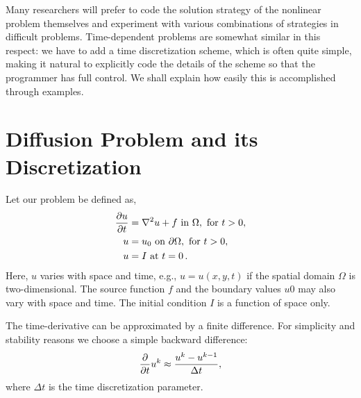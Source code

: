 Many researchers will prefer to code the solution strategy of the nonlinear problem themselves and experiment with various combinations of strategies in difficult problems. Time-dependent problems are somewhat similar in this respect: we have to add a time discretization scheme, which is often quite simple, making it natural to explicitly code the details of the scheme so that the programmer has full control. We shall explain how easily this is accomplished through examples.

\section{Diffusion Problem and its Discretization}
Let our problem be defined as,
\begin{eqnarray}
\begin{split}{\partial u\over\partial t} &= \nabla^2 u + f \mbox{ in } \Omega, \hbox{ for } t>0,
\\
u &= u_0 \mbox{ on } \partial \Omega,\hbox{ for } t>0,
\\
u &= I   \mbox{ at } t=0\thinspace .\end{split}
\end{eqnarray}
Here, $u$ varies with space and time, e.g., $u=u(x,y,t)$ if the spatial domain $\Omega$ is two-dimensional. The source function $f$ and the boundary values $u0$ may also vary with space and time. The initial condition $I$ is a function of space only.

\noindent The time-derivative can be approximated by a finite difference. For simplicity and stability reasons we choose a simple backward difference:
\begin{eqnarray}
{\partial \over\partial t}u^k\approx {u^k - u^{k-1}\over{\Delta t}},
\end{eqnarray}
where $\Delta t$ is the time discretization parameter.

\pagebreak

